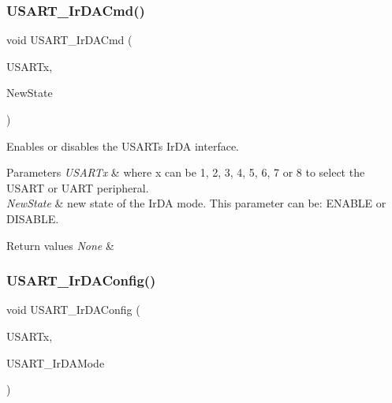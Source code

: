 \subsubsection{\texorpdfstring{U\+S\+A\+R\+T\+\_\+\+Ir\+D\+A\+Cmd()}{USART\_IrDACmd()}}
{\footnotesize\ttfamily void U\+S\+A\+R\+T\+\_\+\+Ir\+D\+A\+Cmd (\begin{DoxyParamCaption}\item[{U\+S\+A\+R\+T\+\_\+\+Type\+Def $\ast$}]{U\+S\+A\+R\+Tx,  }\item[{Functional\+State}]{New\+State }\end{DoxyParamCaption})}



Enables or disables the U\+S\+A\+RT\textquotesingle{}s Ir\+DA interface. 


\begin{DoxyParams}{Parameters}
{\em U\+S\+A\+R\+Tx} & where x can be 1, 2, 3, 4, 5, 6, 7 or 8 to select the U\+S\+A\+RT or U\+A\+RT peripheral. \\
\hline
{\em New\+State} & new state of the Ir\+DA mode. This parameter can be\+: E\+N\+A\+B\+LE or D\+I\+S\+A\+B\+LE. \\
\hline
\end{DoxyParams}

\begin{DoxyRetVals}{Return values}
{\em None} & \\
\hline
\end{DoxyRetVals}
\mbox{\label{group___u_s_a_r_t___group7_ga81a0cd36199040bf6d266b57babd678e}} 
\subsubsection{\texorpdfstring{U\+S\+A\+R\+T\+\_\+\+Ir\+D\+A\+Config()}{USART\_IrDAConfig()}}
{\footnotesize\ttfamily void U\+S\+A\+R\+T\+\_\+\+Ir\+D\+A\+Config (\begin{DoxyParamCaption}\item[{U\+S\+A\+R\+T\+\_\+\+Type\+Def $\ast$}]{U\+S\+A\+R\+Tx,  }\item[{uint16\+\_\+t}]{U\+S\+A\+R\+T\+\_\+\+Ir\+D\+A\+Mode }\end{DoxyParamCaption})}



